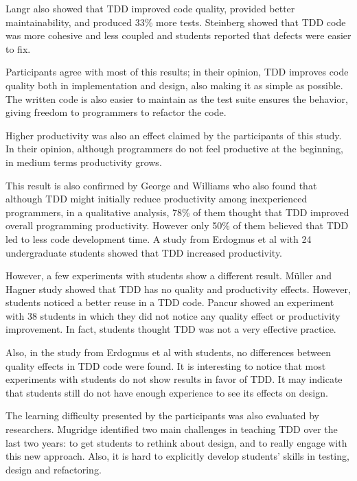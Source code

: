Langr also \cite{langr} showed that TDD improved code quality, provided
better maintainability, and produced 33\% more tests.
Steinberg \cite{steinberg} showed that TDD code was more cohesive and less
coupled and students reported that defects were easier to fix.

Participants agree with most of this results; in their opinion, TDD improves
code quality both in implementation and design, also making it as simple as possible.
The written code is also easier to maintain as the test suite ensures the
behavior, giving freedom to programmers to refactor the code. 

Higher productivity was also an effect claimed by the participants of this
study. In their opinion, although programmers do not feel productive at the
beginning, in medium terms productivity grows. 

This result is also confirmed by George and
Williams who also found that although TDD might initially reduce productivity
among inexperienced programmers, in a qualitative analysis, 78\% of them thought that 
TDD improved overall programming productivity. However only 50\% of them 
believed that TDD led to less code development time.
A study from Erdogmus et al \cite{erdogmus} with 24 undergraduate students
showed that TDD increased productivity. 

However, a few experiments with students show a different result. Müller and
Hagner \cite{muller} study showed that TDD has no quality and productivity 
effects. However, students noticed a better reuse in a TDD code.
Pancur \cite{pancur} showed an experiment with 38 students in which they did not
notice any quality effect or productivity improvement. In fact, students 
thought TDD was not a very effective practice.

Also, in the study from Erdogmus et al with students, no differences between
quality effects in TDD code were found. It is interesting to notice that most
experiments with students do not show results in favor of TDD. It may indicate
that students still do not have enough experience to see its effects on design.

The learning difficulty presented by the participants was also evaluated by
researchers. Mugridge \cite{mugridge} identified two main challenges in
teaching TDD over the last two years: to get students to rethink about design, 
and to really engage with this new approach. Also, it is
hard to explicitly develop students' skills in testing, design and refactoring.

